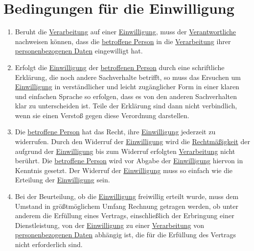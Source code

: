\chapter{Bedingungen für die Einwilligung}
\label{ch:7}


\begin{enumerate}

  \item Beruht die \hyperref[itm:04-2]{Verarbeitung} auf einer \hyperref[itm:04-11]{Einwilligung}, muss der \hyperref
   [itm:04-7]{Verantwortliche} nachweisen können, dass die \hyperref[itm:04-1]{betroffene Person} in die \hyperref
   [itm:04-2]{Verarbeitung} ihrer \hyperref[itm:04-1]{personenbezogenen Daten} eingewilligt hat.%
  \label{itm:07-1}

  \item Erfolgt die \hyperref[itm:04-11]{Einwilligung} der \hyperref[itm:04-1]{betroffenen Person} durch eine
   schriftliche Erklärung, die noch andere Sachverhalte betrifft, so muss das Ersuchen um \hyperref[itm:04-11]
   {Einwilligung} in verständlicher und leicht zugänglicher Form in einer klaren und einfachen Sprache so erfolgen,
   dass es von den anderen Sachverhalten klar zu unterscheiden ist. Teile der Erklärung sind dann nicht verbindlich,
   wenn sie einen Verstoß gegen diese Verordnung darstellen.%
  \label{itm:07-2}

  \item Die \hyperref[itm:04-1]{betroffene Person} hat das Recht, ihre \hyperref[itm:04-11]{Einwilligung} jederzeit zu
   widerrufen. Durch den Widerruf der
   \hyperref[itm:04-11]{Einwilligung} wird die \hyperref[itm:05-1a]{Rechtmäßigkeit} der aufgrund der \hyperref
    [itm:04-11]{Einwilligung} bis zum Widerruf erfolgten \hyperref[itm:04-2]{Verarbeitung} nicht berührt. Die \hyperref
    [itm:04-1]{betroffene Person} wird vor Abgabe der \hyperref[itm:04-11]{Einwilligung} hiervon in Kenntnis gesetzt.
    Der Widerruf der
   \hyperref[itm:04-11]{Einwilligung} muss so einfach wie die Erteilung der \hyperref[itm:04-11]{Einwilligung} sein.%
  \label{itm:07-3}

  \item Bei der Beurteilung, ob die \hyperref[itm:04-11]{Einwilligung} freiwillig erteilt wurde, muss dem Umstand in
   größtmöglichem Umfang Rechnung getragen werden, ob unter anderem die Erfüllung eines Vertrags, einschließlich der
   Erbringung einer Dienstleistung, von der \hyperref[itm:04-11]{Einwilligung} zu einer \hyperref[itm:04-2]
   {Verarbeitung} von \hyperref[itm:04-1]{personenbezogenen Daten} abhängig ist, die für die Erfüllung des Vertrags
   nicht erforderlich sind.%
  \label{itm:07-4}

\end{enumerate}


